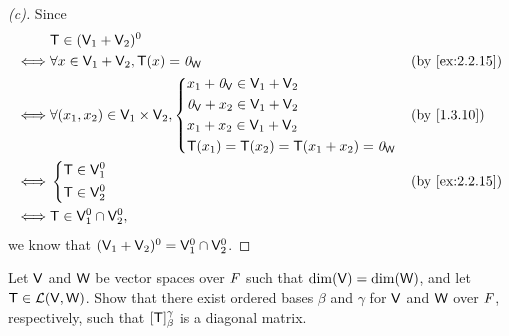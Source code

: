\begin{proof}[(c)]
  Since
  \begin{align*}
         & \T \in (\V_1 + \V_2)^0                                                                    \\
    \iff & \forall x \in \V_1 + \V_2, \T(x) = \zv_{\W}             &  & \text{(by \cref{ex:2.2.15})} \\
    \iff & \forall (x_1, x_2) \in \V_1 \times \V_2, \begin{dcases}
                                                      x_1 + \zv_{\V} \in \V_1 + \V_2 \\
                                                      \zv_{\V} + x_2 \in \V_1 + \V_2 \\
                                                      x_1 + x_2 \in \V_1 + \V_2      \\
                                                      \T(x_1) = \T(x_2) = \T(x_1 + x_2) = \zv_{\W}
                                                    \end{dcases} &  & \text{(by \cref{1.3.10})}      \\
    \iff & \begin{dcases}
             \T \in \V_1^0 \\
             \T \in \V_2^0
           \end{dcases}                                        &  & \text{(by \cref{ex:2.2.15})}     \\
    \iff & \T \in \V_1^0 \cap \V_2^0,
  \end{align*}
  we know that \((\mathsf{V}_1 + \mathsf{V}_2)^0 = \mathsf{V}_1^0 \cap \mathsf{V}_2^0\).
\end{proof}

\begin{ex}\label{ex:2.2.16}
  Let \(\mathsf{V}\) and \(\mathsf{W}\) be vector spaces over \(\mathit{F}\) such that \(\dim(\mathsf{V}) = \dim(\mathsf{W})\), and let \(\mathsf{T} \in \mathcal{L}(\mathsf{V}, \mathsf{W})\).
  Show that there exist ordered bases \(\beta\) and \(\gamma\) for \(\mathsf{V}\) and \(\mathsf{W}\) over \(\mathit{F}\), respectively, such that \([\mathsf{T}]_{\beta}^{\gamma}\) is a diagonal matrix.
\end{ex}

